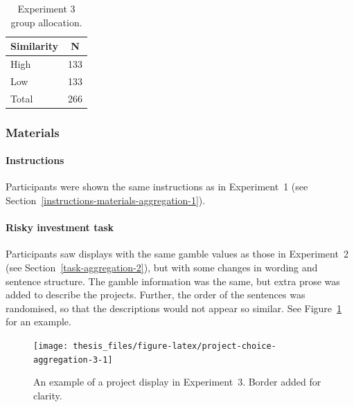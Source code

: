\documentclass[a4paper, nobind, dvipsnames]{templates/ociamthesis}
\theoremstyle{definition}
\theoremstyle{definition}
\theoremstyle{definition}
\theoremstyle{definition}
\theoremstyle{remark}
\begin{document}
\begin{table}[tbp]

\begin{center}
\begin{threeparttable}

\caption{\label{tab:condition-allocation-aggregation-3}Experiment 3 group allocation.}

\begin{tabular}{ll}
\toprule
Similarity & \multicolumn{1}{c}{N}\\
\midrule
High & 133\\
Low & 133\\
Total & 266\\
\bottomrule
\end{tabular}

\end{threeparttable}
\end{center}

\end{table}

\subsubsection{Materials}

\paragraph{Instructions}

Participants were shown the same instructions as in Experiment~1 (see
Section~\ref{instructions-materials-aggregation-1}).

\hypertarget{task-aggregation-3}{%
\paragraph{Risky investment task}\label{task-aggregation-3}}

Participants saw displays with the same gamble values as those in Experiment~2
(see Section~\ref{task-aggregation-2}), but with some changes in wording and
sentence structure. The gamble information was the same, but extra prose was
added to describe the projects. Further, the order of the sentences was
randomised, so that the descriptions would not appear so similar. See
Figure~\ref{fig:project-choice-aggregation-3} for an example.



\begin{figure}
\texttt{[image: thesis\_files/figure-latex/project-choice-aggregation-3-1]} \caption{An example of a project display in Experiment~3. Border added for clarity.}\label{fig:project-choice-aggregation-3}
\end{figure}
\end{document}
